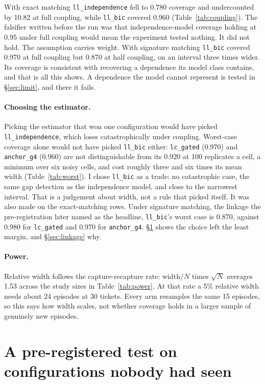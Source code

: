 \documentclass[11pt]{article}
\begin{document}
With exact matching \texttt{ll\_independence} fell to 0.780 coverage and
undercounted by 10.82 at full coupling, while \texttt{ll\_bic} covered 0.960
(Table~\ref{tab:coupling}). The falsifier written before the run was that
independence-model coverage holding at 0.95 under full coupling would mean the
experiment tested nothing. It did not hold. The assumption carries weight. With
signature matching \texttt{ll\_bic} covered 0.970 at full coupling but 0.870 at
half coupling, on an interval three times wider. Its coverage is consistent with
recovering a dependence its model class contains, and that is all this shows. A dependence the model cannot represent
is tested in \S\ref{sec:limit}, and there it fails.

\paragraph{Choosing the estimator.}
Picking the estimator that won one configuration would have picked
\texttt{ll\_independence}, which loses catastrophically under coupling. Worst-case
coverage alone would not have picked \texttt{ll\_bic} either:
\texttt{lc\_gated} (0.970) and \texttt{anchor\_g4} (0.960) are not
distinguishable from its 0.920 at 100 replicates a cell, a minimum over six
noisy cells, and cost roughly three and six times its mean width
(Table~\ref{tab:worst}). I chose
\texttt{ll\_bic} as a trade: no catastrophic case, the same gap detection as the
independence model, and close to the narrowest interval. That is a judgement
about width, not a rule that picked itself. It was also made on the exact-matching
rows. Under signature matching, the linkage the pre-registration later named as
the headline, \texttt{ll\_bic}'s worst case is 0.870, against 0.980 for
\texttt{lc\_gated} and 0.970 for \texttt{anchor\_g4}. \S\ref{sec:confirm} shows
the choice left the least margin, and \S\ref{sec:linkage} why.


\paragraph{Power.}
Relative width follows the capture-recapture rate: width$/N$ times $\sqrt{N}$
averages 1.53 across the study sizes in Table~\ref{tab:power}. At that rate a
5\% relative width needs about 24 episodes at 30 tickets. Every arm resamples
the same 15 episodes, so this says how width scales, not whether coverage holds
in a larger sample of genuinely new episodes.


\section{A pre-registered test on configurations nobody had seen}
\label{sec:confirm}
\end{document}
